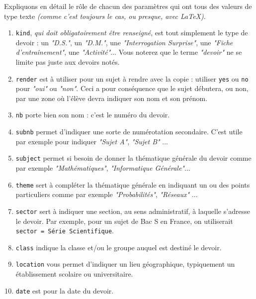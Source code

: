 \documentclass[12pt,a4paper]{article}
\theoremstyle{definition}
\begin{document}
Expliquons en détail le rôle de chacun des paramètres qui ont tous des valeurs de type texte \emph{(comme c'est toujours le cas, ou presque, avec \LaTeX{})}.

\begin{enumerate}
	\item \verb+kind+, \emph{qui doit obligatoirement être renseigné}, est tout simplement le type de devoir : un \emph{"D.S."}, un \emph{"D.M."}, une \emph{"Interrogation Surprise"}, une \emph{"Fiche d'entraînement"}, une \emph{"Activité"}...
	Vous noterez que le terme \emph{"devoir"} ne se limite pas juste aux devoirs notés.

	\item \verb+render+ est à utiliser pour un sujet à rendre avec la copie : utiliser \verb+yes+ ou \verb+no+ pour \emph{"oui"} ou \emph{"non"}.
	Ceci a pour conséquence que le sujet débutera, ou non, par une zone où l'élève devra indiquer son nom et son prénom.

	\item \verb+nb+ porte bien son nom : c'est le numéro du devoir.

	\item \verb+subnb+ permet d'indiquer une sorte de numérotation secondaire. C'est utile par exemple pour indiquer \emph{"Sujet A"}, \emph{"Sujet B"} ...

	\item \verb+subject+ permet si besoin de donner la thématique générale du devoir comme par exemple \emph{"Mathématiques"}, \emph{"Informatique Générale"}...

	\item \verb+theme+ sert à compléter la thématique générale en indiquant un ou des points particuliers comme par exemple \emph{"Probabilités"}, \emph{"Réseaux"} ...

	\item \verb+sector+ sert à indiquer une section, au sens administratif, à laquelle s'adresse le devoir. Par exemple, pour un sujet de Bac S en France, on utiliserait \verb+sector = Série Scientifique+.

	\item \verb+class+ indique la classe et/ou le groupe auquel est destiné le devoir.

	\item \verb+location+ vous permet d'indiquer un lieu géographique, typiquement un établissement scolaire ou universitaire.

	\item \verb+date+ est pour la date du devoir.


\end{enumerate}
\end{document}
